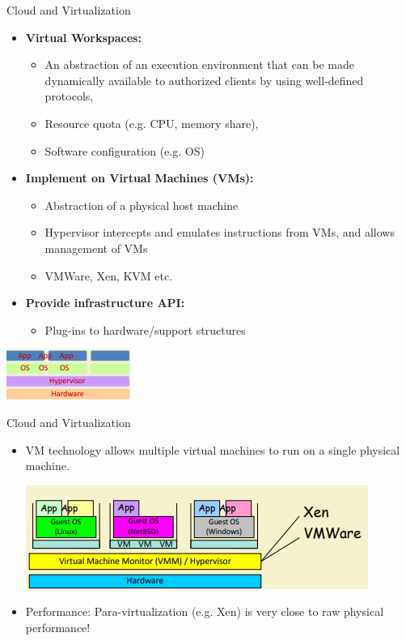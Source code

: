 \documentclass{SKP-beamer}
\begin{document}
\begin{frame}{Cloud and Virtualization}
	\begin{itemize}
		
		\item  \textbf{Virtual Workspaces:} 
		\begin{itemize}
			\item An abstraction of an execution environment that can be made dynamically available to
			authorized clients by using well-defined protocols,
			\item Resource quota (e.g. CPU, memory share),
			\item Software configuration (e.g. OS)
			
		\end{itemize}
		\item  \textbf{Implement on Virtual Machines (VMs):} 
		\begin{itemize}
			\item  Abstraction of a physical host machine
			\item Hypervisor intercepts and emulates instructions from VMs, and allows management of VMs
			\item VMWare, Xen, KVM etc.
			
		\end{itemize}
		\item  \textbf{Provide infrastructure API:} 
		\begin{itemize}
			\item  Plug-ins to hardware/support 
			structures 
		\end{itemize}
		
	\end{itemize}
	
	\includegraphics[scale=1.5]{13.png}
	
\end{frame}


\begin{frame}{Cloud and Virtualization}
	\begin{itemize}
		
		\item  VM technology allows multiple virtual machines to run on a single
		physical machine.
		
		\includegraphics[scale=1.2]{14.png}
		
		\item Performance: Para-virtualization (e.g. Xen) is very close to raw physical
		performance!
	\end{itemize}
\end{frame}
\end{document}
